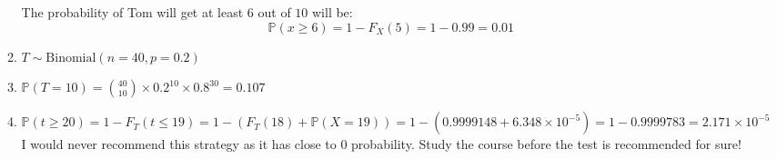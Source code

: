 \documentclass[12pt, oneside, a4paper]{article}
\begin{document}
\begin{enumerate}
\begin{enumerate}[label = (\alph*)]
			The probability of Tom will get at least $6$ out of $10$ will be:
			\[ \mathbb{P}(x\geq 6) = 1 - F_X(5) = 1 - 0.99 = 0.01\]
			\item $T \sim \text{Binomial}(n = 40, p = 0.2)$
			\item $\mathbb{P}(T = 10) = \binom{40}{10} \times 0.2 ^ {10} \times 0.8 ^ {30}  = 0.107$
			\item  $\mathbb{P}(t\geq 20) = 1 - F_T(t\leq 19) = 1 - (F_T(18) + \mathbb{P}(X = 19)) = 1 - (0.9999148 + 6.348\times 10^{-5}) = 1 - 0.9999783 = 2.171 \times 10 ^{-5}$
			I would never recommend this strategy as it has close to $0$ probability. Study the course before the test is recommended for sure!
		\end{enumerate}
		

		
		
	\end{enumerate}
\end{document}
